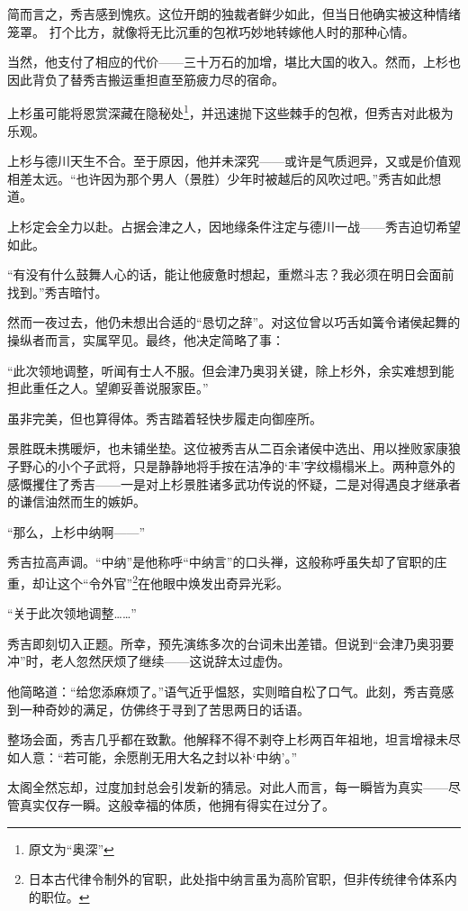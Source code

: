 \documentclass[
]{book}
\begin{document}
简而言之，秀吉感到愧疚。这位开朗的独裁者鲜少如此，但当日他确实被这种情绪笼罩。
打个比方，就像将无比沉重的包袱巧妙地转嫁他人时的那种心情。

当然，他支付了相应的代价------三十万石的加增，堪比大国的收入。然而，上杉也因此背负了替秀吉搬运重担直至筋疲力尽的宿命。

上杉虽可能将恩赏深藏在隐秘处\footnote{原文为``奥深''}，并迅速抛下这些棘手的包袱，但秀吉对此极为乐观。

上杉与德川天生不合。至于原因，他并未深究------或许是气质迥异，又或是价值观相差太远。``也许因为那个男人（景胜）少年时被越后的风吹过吧。''秀吉如此想道。

上杉定会全力以赴。占据会津之人，因地缘条件注定与德川一战------秀吉迫切希望如此。

``有没有什么鼓舞人心的话，能让他疲惫时想起，重燃斗志？我必须在明日会面前找到。''秀吉暗忖。

然而一夜过去，他仍未想出合适的``恳切之辞''。对这位曾以巧舌如簧令诸侯起舞的操纵者而言，实属罕见。最终，他决定简略了事：

``此次领地调整，听闻有士人不服。但会津乃奥羽关键，除上杉外，余实难想到能担此重任之人。望卿妥善说服家臣。''

虽非完美，但也算得体。秀吉踏着轻快步履走向御座所。

景胜既未携暖炉，也未铺坐垫。这位被秀吉从二百余诸侯中选出、用以挫败家康狼子野心的小个子武将，只是静静地将手按在洁净的`丰'字纹榻榻米上。两种意外的感慨攫住了秀吉------一是对上杉景胜诸多武功传说的怀疑，二是对得遇良才继承者的谦信油然而生的嫉妒。

``那么，上杉中纳啊------''

秀吉拉高声调。``中纳''是他称呼``中纳言''的口头禅，这般称呼虽失却了官职的庄重，却让这个``令外官''\footnote{日本古代律令制外的官职，此处指中纳言虽为高阶官职，但非传统律令体系内的职位。}在他眼中焕发出奇异光彩。

``关于此次领地调整\ldots\ldots{}''

秀吉即刻切入正题。所幸，预先演练多次的台词未出差错。但说到``会津乃奥羽要冲''时，老人忽然厌烦了继续------这说辞太过虚伪。

他简略道：``给您添麻烦了。''语气近乎愠怒，实则暗自松了口气。此刻，秀吉竟感到一种奇妙的满足，仿佛终于寻到了苦思两日的话语。

整场会面，秀吉几乎都在致歉。他解释不得不剥夺上杉两百年祖地，坦言增禄未尽如人意：``若可能，余愿削无用大名之封以补`中纳'。''

太阁全然忘却，过度加封总会引发新的猜忌。对此人而言，每一瞬皆为真实------尽管真实仅存一瞬。这般幸福的体质，他拥有得实在过分了。
\end{document}
